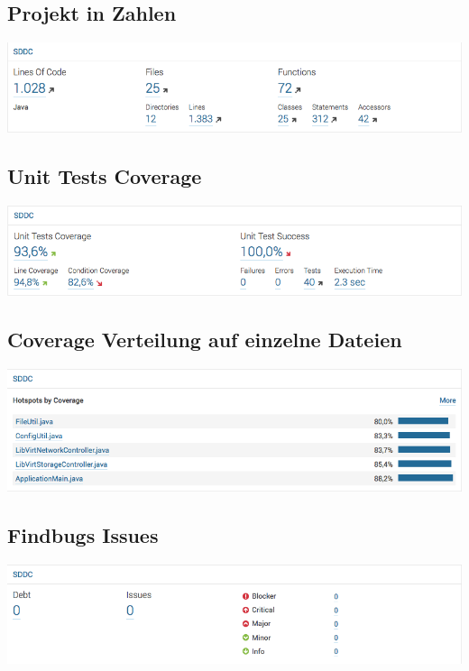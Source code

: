 \subsection{Projekt in Zahlen}
\includegraphics[width=\textwidth]{./10_Protokolle/04_Testprotokoll/images/Sprint3/loc}

\subsection{Unit Tests Coverage}
\includegraphics[width=\textwidth]{./10_Protokolle/04_Testprotokoll/images/Sprint3/coverage}

\subsection{Coverage Verteilung auf einzelne Dateien}
\includegraphics[width=\textwidth]{./10_Protokolle/04_Testprotokoll/images/Sprint3/coverageperfile}

\subsection{Findbugs Issues}
\includegraphics[width=\textwidth]{./10_Protokolle/04_Testprotokoll/images/Sprint3/issues}

